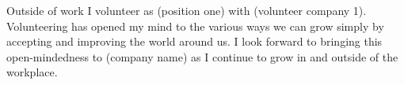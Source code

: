 Outside of work I volunteer as (position one) with (volunteer company 1). Volunteering has opened my mind to the various ways we can grow simply by accepting and improving the world around us. I look forward to bringing this open-mindedness to (company name) as I continue to grow in and outside of the workplace.